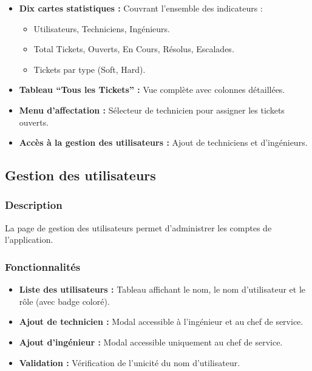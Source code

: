 \documentclass[12pt,a4paper,oneside]{report}
\begin{document}
\begin{itemize}
    \item \textbf{Dix cartes statistiques :} Couvrant l'ensemble des indicateurs :
    \begin{itemize}
        \item Utilisateurs, Techniciens, Ingénieurs.
        \item Total Tickets, Ouverts, En Cours, Résolus, Escalades.
        \item Tickets par type (Soft, Hard).
    \end{itemize}
    \item \textbf{Tableau ``Tous les Tickets'' :} Vue complète avec colonnes détaillées.
    \item \textbf{Menu d'affectation :} Sélecteur de technicien pour assigner les tickets ouverts.
    \item \textbf{Accès à la gestion des utilisateurs :} Ajout de techniciens et d'ingénieurs.
\end{itemize}

\subsection{Gestion des utilisateurs}

\subsubsection{Description}

La page de gestion des utilisateurs permet d'administrer les comptes de l'application.

\subsubsection{Fonctionnalités}

\begin{itemize}
    \item \textbf{Liste des utilisateurs :} Tableau affichant le nom, le nom d'utilisateur et le rôle (avec badge coloré).
    \item \textbf{Ajout de technicien :} Modal accessible à l'ingénieur et au chef de service.
    \item \textbf{Ajout d'ingénieur :} Modal accessible uniquement au chef de service.
    \item \textbf{Validation :} Vérification de l'unicité du nom d'utilisateur.
\end{itemize}
\end{document}
